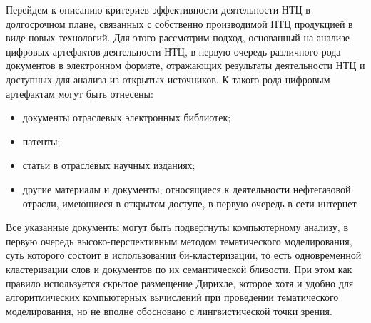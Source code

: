 Перейдем к описанию критериев эффективности деятельности НТЦ в долгосрочном плане, связанных с собственно производимой НТЦ продукцией в виде новых технологий.
Для этого рассмотрим подход, основанный на анализе цифровых артефактов деятельности НТЦ, в первую очередь различного рода документов в электронном формате, отражающих результаты деятельности НТЦ и доступных для анализа из открытых источников.
К такого рода цифровым артефактам могут быть отнесены:  

\begin{itemize} 
	\tightlist 
	\item документы отраслевых электронных библиотек; 
	\item патенты; 
	\item статьи в отраслевых научных изданиях; 
	\item другие материалы и документы, относящиеся к деятельности нефтегазовой отрасли, имеющиеся в открытом доступе, в первую очередь в сети интернет 
\end{itemize}  

Все указанные документы могут быть подвергнуты компьютерному анализу, в первую очередь высоко-перспективным методом тематического моделирования, суть которого состоит в использовании би-кластеризации, то есть одновременной кластеризации слов и документов по их семантической близости.
При этом как правило используется скрытое размещение Дирихле, которое хотя и удобно для алгоритмических компьютерных вычислений при проведении тематического моделирования, но не вполне обосновано с лингвистической точки зрения.

